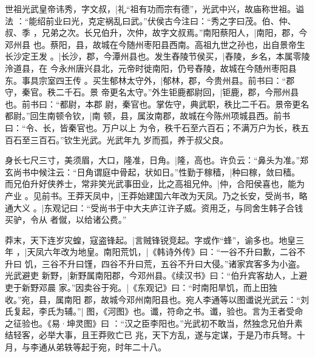\documentclass{article}
\begin{document}
\begin{CJK*}{GBK}{song}


\makeatletter
\gezhu@makespecials
\loop
\noindent\hrulefill\par
\the\hsize\par
\begin{withgezhu}
	\parskip=30pt

世祖光武皇帝讳秀，字文叔，|{礼“{祖有功而宗有德}”，光武中兴，故庙称世祖。谥法
：“能绍前业曰光，克定祸乱曰武。”伏侯古今注曰：“秀之字曰茂。伯、仲、叔、季
，兄弟之次。长兄伯升，次仲，故字文叔焉。”}南阳蔡阳人，|{南阳，郡，今邓州县
也。蔡阳，县，故城在今随州枣阳县西南。}高祖九世之孙也，出自景帝生长沙定王发
。|{长沙，郡，今潭州县也。}发生舂陵节侯买，|{舂陵，乡名，本属零陵泠道县，在
今永州唐兴县北，元帝时徙南阳，仍号舂陵，故城在今随州枣阳县东。事具宗室四王传
。}买生郁林太守外，|{郁林，郡，今贵州县。前书曰：“郡守，秦官。秩二千石。景
帝更名太守。”}外生钜鹿都尉回，|{钜鹿，郡，今邢州县也。前书曰：“都尉，本{郡
尉}，秦官也。掌佐守，典武职，秩比二千石。景帝更名都尉。”}回生南顿令钦，|{南
顿，县，属汝南郡，故城在今陈州项城县西。前书曰：“令、长，皆秦官也。万户以上
为令，秩千石至六百石；不满万户为长，秩五百石至三百石。”}钦生光武。光武年九
岁而孤，养于叔父良。

身长七尺三寸，美须眉，大口，隆准，日角。|{隆，高也。许负云：“鼻头为准。”郑
玄尚书中候注云：“日角谓庭中骨起，状如日。”}性勤于稼穑，|{种曰稼，敛曰穑。}
而兄伯升好侠养士，常非笑光武事田业，比之高祖兄仲。|{仲，合阳侯喜也，能为产业
。见前书。}王莽天凤中，|{王莽始建国六年改为天凤。}乃之长安，受尚书，略通大义
。|{东观记曰：“受尚书于中大夫庐江许子威。资用乏，与同舍生韩子合钱买驴，令从
者僦，以给诸公费。”}

莽末，天下连岁灾蝗，寇盗锋起。|{言贼锋锐竞起。字或作“蜂”，谕多也。}地皇三年
，|{天凤六年改为地皇。}南阳荒饥，|{《韩诗外传》曰：“一谷不升曰歉，二谷不升曰
饥，三谷不升曰馑，四谷不升曰荒，五谷不升曰大侵。”}诸家宾客多为小盗。光武避吏
新野，|{新野属南阳郡，今邓州县。《续汉书》曰：“伯升宾客劫人，上避吏于新野邓晨
家。”}因卖谷于宛。|{《东观记》曰：“时南阳旱饥，而上田独收。”宛，县，属南阳
郡，故城今邓州南阳县也。}宛人李通等以图谶说光武云：“刘氏复起，李氏为辅。”|{
图，《河图》也。谶，符命之书。谶，验也。言为王者受命之征验也。《易·坤灵图》曰
：“汉之臣李阳也。”}光武初不敢当，然独念兄伯升素结轻客，必举大事，且王莽败亡已
兆，天下方乱，遂与定谋，于是乃市兵弩。十月，与李通从弟轶等起于宛，时年二十八。


\end{withgezhu}
\end{CJK*}
\end{document}
